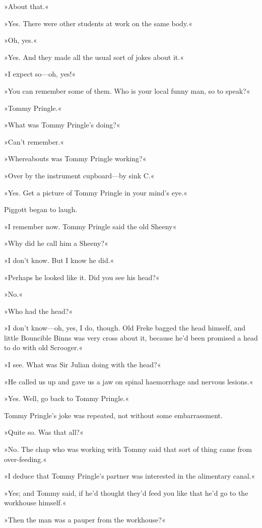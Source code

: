 »About that.«

»Yes. There were other students at work on the same body.«

»Oh, yes.«

»Yes. And they made all the usual sort of jokes about it.«

»I expect so—oh, yes!«

»You can remember some of them. Who is your local funny man, so to speak?«

»Tommy Pringle.«

»What was Tommy Pringle's doing?«

»Can't remember.«

»Whereabouts was Tommy Pringle working?«

»Over by the instrument cupboard—by sink C.«

»Yes. Get a picture of Tommy Pringle in your mind's eye.«

Piggott began to laugh.

»I remember now. Tommy Pringle said the old Sheeny\longdash«

»Why did he call him a Sheeny?«

»I don't know. But I know he did.«

»Perhaps he looked like it. Did you see his head?«

»No.«

»Who had the head?«

»I don't know—oh, yes, I do, though. Old Freke bagged the head himself, and little Bouncible Binns was very cross about it, because he'd been promised a head to do with old Scrooger.«

»I see. What was Sir Julian doing with the head?«

»He called us up and gave us a jaw on spinal haemorrhage and nervous lesions.«

»Yes. Well, go back to Tommy Pringle.«

Tommy Pringle's joke was repeated, not without some embarrassment.

»Quite so. Was that all?«

»No. The chap who was working with Tommy said that sort of thing came from over-feeding.«

»I deduce that Tommy Pringle's partner was interested in the alimentary canal.«

»Yes; and Tommy said, if he'd thought they'd feed you like that he'd go to the workhouse himself.«

»Then the man was a pauper from the workhouse?«

